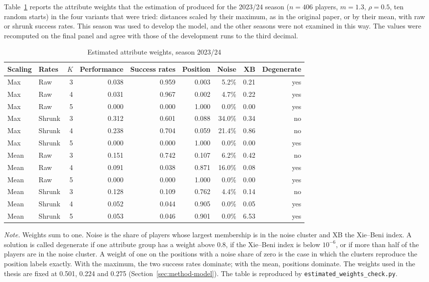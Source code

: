 Table~\ref{tab:weights} reports the attribute weights that the estimation of  produced for the 2023/24 season ($n=406$ players, $m=1.3$, $\rho=0.5$, ten random starts) in the four variants that were tried: distances scaled by their maximum, as in the original paper, or by their mean, with raw or shrunk success rates. This season was used to develop the model, and the other seasons were not examined in this way. The values were recomputed on the final panel and agree with those of the development runs to the third decimal.

\begin{table}[ht]
	\centering
	\small
	\caption{Estimated attribute weights, season 2023/24}
	\label{tab:weights}
	\begin{tabular}{llrrrrrrr}
		\toprule
		Scaling & Rates & $K$ & Performance & Success rates & Position & Noise & XB & Degenerate \\
		\midrule
		Max & Raw & 3 & 0.038 & 0.959 & 0.003 & 5.2\% & 0.21 & yes \\
		Max & Raw & 4 & 0.031 & 0.967 & 0.002 & 4.7\% & 0.22 & yes \\
		Max & Raw & 5 & 0.000 & 0.000 & 1.000 & 0.0\% & 0.00 & yes \\
		Max & Shrunk & 3 & 0.312 & 0.601 & 0.088 & 34.0\% & 0.34 & no \\
		Max & Shrunk & 4 & 0.238 & 0.704 & 0.059 & 21.4\% & 0.86 & no \\
		Max & Shrunk & 5 & 0.000 & 0.000 & 1.000 & 0.0\% & 0.00 & yes \\
		Mean & Raw & 3 & 0.151 & 0.742 & 0.107 & 6.2\% & 0.42 & no \\
		Mean & Raw & 4 & 0.091 & 0.038 & 0.871 & 16.0\% & 0.08 & yes \\
		Mean & Raw & 5 & 0.000 & 0.000 & 1.000 & 0.0\% & 0.00 & yes \\
		Mean & Shrunk & 3 & 0.128 & 0.109 & 0.762 & 4.4\% & 0.14 & no \\
		Mean & Shrunk & 4 & 0.052 & 0.044 & 0.905 & 0.0\% & 0.05 & yes \\
		Mean & Shrunk & 5 & 0.053 & 0.046 & 0.901 & 0.0\% & 6.53 & yes \\
		\bottomrule
	\end{tabular}
	\par\smallskip
	\parbox{0.95\textwidth}{\footnotesize\emph{Note.} Weights sum to one. Noise is the share of players whose largest membership is in the noise cluster and XB the Xie--Beni index. A solution is called degenerate if one attribute group has a weight above 0.8, if the Xie--Beni index is below $10^{-6}$, or if more than half of the players are in the noise cluster. A weight of one on the positions with a noise share of zero is the case in which the clusters reproduce the position labels exactly. With the maximum, the two success rates dominate; with the mean, positions dominate. The weights used in the thesis are fixed at 0.501, 0.224 and 0.275 (Section~\ref{sec:method-model}). The table is reproduced by \texttt{estimated\_weights\_check.py}.}
\end{table}

